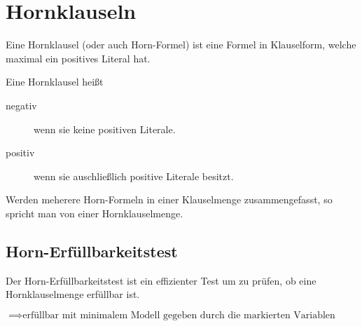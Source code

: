     \section{Hornklauseln}
        Eine Hornklausel (oder auch Horn-Formel) ist eine Formel in Klauselform, welche maximal ein positives Literal hat.


        Eine Hornklausel heißt
        \begin{description}
            \item[negativ] wenn sie keine positiven Literale.
            \item[positiv] wenn sie auschließlich positive Literale besitzt.
        \end{description}

        Werden meherere Horn-Formeln in einer Klauselmenge zusammengefasst, so spricht man von einer Hornklauselmenge.

        \subsection{Horn-Erfüllbarkeitstest}
            Der Horn-Erfüllbarkeitstest ist ein effizienter Test um zu prüfen, ob eine Hornklauselmenge erfüllbar ist.

            \begin{algorithm}[H]

                $ \implies \text{erfüllbar mit minimalem Modell gegeben durch die markierten Variablen} $
            \end{algorithm}

